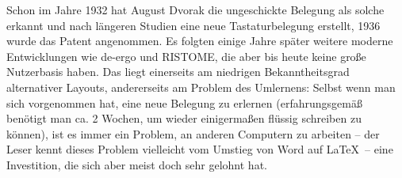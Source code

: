 \documentclass[ngerman]{dtk}
\begin{document}
Schon im Jahre 1932 hat August Dvorak die ungeschickte Belegung als solche erkannt und nach längeren Studien eine neue Tastaturbelegung erstellt, 1936 wurde das Patent \cite{patentdvorak} angenommen. Es folgten einige Jahre später weitere moderne Entwicklungen wie de-ergo und RISTOME, die aber bis heute keine große Nutzerbasis haben. \cite{deergo,ristome} Das liegt einerseits am niedrigen Bekanntheitsgrad alternativer Layouts, andererseits am Problem des Umlernens: Selbst wenn man sich vorgenommen hat, eine neue Belegung zu erlernen (erfahrungsgemäß benötigt man ca. 2 Wochen, um wieder einigermaßen flüssig schreiben zu können), ist es immer ein Problem, an anderen Computern zu arbeiten – der Leser kennt dieses Problem vielleicht vom Umstieg von Word auf \LaTeX\ – eine Investition, die sich aber meist doch sehr gelohnt hat.
\end{document}
